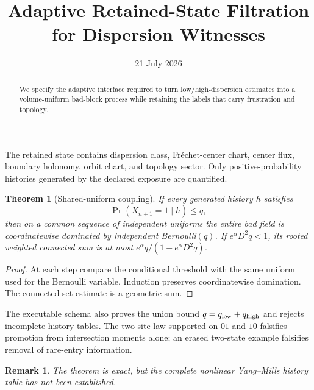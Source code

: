 \documentclass[11pt]{article}\usepackage[margin=1in]{geometry}\usepackage{amsmath,amsthm}\newtheorem{theorem}{Theorem}\newtheorem{remark}{Remark}
\title{Adaptive Retained-State Filtration for Dispersion Witnesses}\author{}\date{21 July 2026}
\begin{document}
\maketitle
\begin{abstract}We specify the adaptive interface required to turn low/high-dispersion estimates into a volume-uniform bad-block process while retaining the labels that carry frustration and topology.\end{abstract}
The retained state contains dispersion class, Fr\'echet-center chart, center flux, boundary holonomy, orbit chart, and topology sector. Only positive-probability histories generated by the declared exposure are quantified.
\begin{theorem}[Shared-uniform coupling]If every generated history $h$ satisfies
\[\Pr(X_{n+1}=1\mid h)\le q,
\]
then on a common sequence of independent uniforms the entire bad field is coordinatewise dominated by independent Bernoulli$(q)$. If $e^\alpha D^2q<1$, its rooted weighted connected sum is at most $e^\alpha q/(1-e^\alpha D^2q)$.\end{theorem}
\begin{proof}At each step compare the conditional threshold with the same uniform used for the Bernoulli variable. Induction preserves coordinatewise domination. The connected-set estimate is a geometric sum.\end{proof}
The executable schema also proves the union bound $q=q_{\rm low}+q_{\rm high}$ and rejects incomplete history tables. The two-site law supported on $01$ and $10$ falsifies promotion from intersection moments alone; an erased two-state example falsifies removal of rare-entry information.
\begin{remark}The theorem is exact, but the complete nonlinear Yang--Mills history table has not been established.\end{remark}
\end{document}

